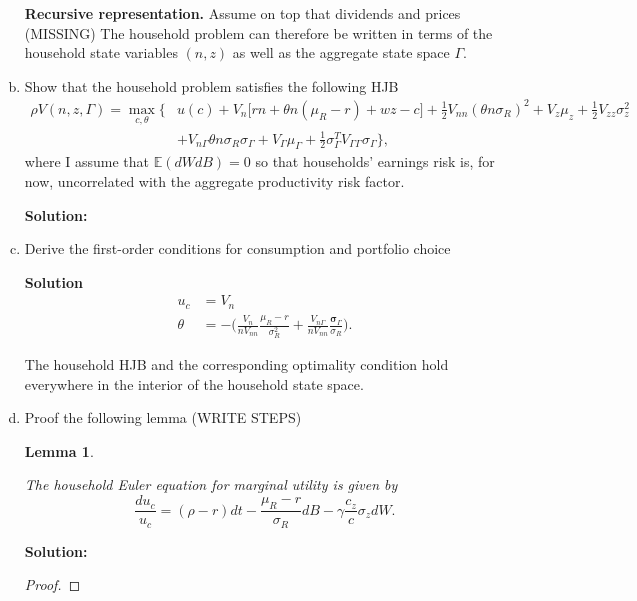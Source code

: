 \documentclass[11pt]{extarticle}
\theoremstyle{plain}
\newtheorem{lem}[thm]{Lemma}
\theoremstyle{definition}
\begin{document}
\begin{enumerate}[(a)]
\vspace{5mm}
\noindent
\textbf{Recursive representation.} Assume on top that dividends and prices (MISSING)
The household problem can therefore be written in terms of the household state variables $(n,z)$ as well as the aggregate state space $\Gamma$. 
\item Show that the household problem satisfies the following HJB
\begin{align*}
	\rho V(n,z,\Gamma) = \max_{c,\theta} \bigg\{  & u(c) + V_n \Big[ rn + \theta n (\mu_R - r) + wz - c \Big] + \frac{1}{2} V_{nn} (\theta n \sigma_R)^2 +  V_z \mu_z + \frac{1}{2} V_{zz} \sigma_z^2  \\
	& + V_{n \Gamma} \theta n \sigma_R \sigma_\Gamma + V_\Gamma \mu_\Gamma + \frac{1}{2} \sigma_\Gamma^T V_{\Gamma \Gamma} \sigma_\Gamma \bigg\},
\end{align*}
where I assume that $\mathbb{E}(dW dB) = 0$ so that households' earnings risk is, for now, uncorrelated with the aggregate productivity risk factor.

\textbf{Solution:}

\item Derive the first-order conditions for consumption and portfolio choice

\textbf{Solution}
\begin{align*}
	u_c &= V_n \\
	\theta  &= - \bigg( \frac{V_n}{n V_{nn} } \frac{\mu_R - r}{\sigma_R^2 } + \frac{V_{n \Gamma} }{n V_{nn} } \frac{ \bm \sigma_\Gamma }{\sigma_R} \bigg).
\end{align*}


The household HJB and the corresponding optimality condition hold everywhere in the interior of the household state space. 

\item Proof the following lemma (WRITE STEPS)

\begin{lem}\label{lem:MUEuler}
	
	The household Euler equation for marginal utility is given by
	\begin{equation*}
		\frac{d u_c}{u_c} = (\rho - r) dt -  \frac{\mu_R - r}{\sigma_R} dB  - \gamma \frac{c_z}{c} \sigma_z dW .
	\end{equation*}
	
\end{lem}

\textbf{Solution:}

\vspace{2mm}
\noindent
\begin{proof}
	

\end{proof}
\end{enumerate}
\end{document}
